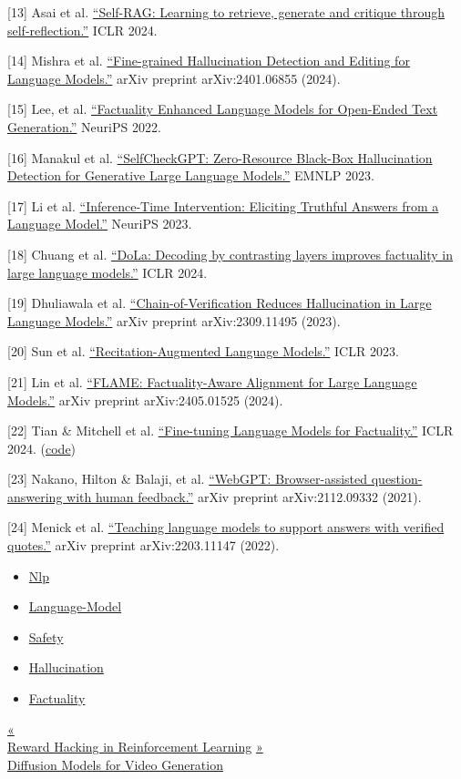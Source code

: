 {[}13{]} Asai et al. \href{https://arxiv.org/abs/2310.11511}{``Self-RAG: Learning to retrieve, generate and critique through self-reflection.''} ICLR 2024.

{[}14{]} Mishra et al. \href{https://arxiv.org/abs/2401.06855}{``Fine-grained Hallucination Detection and Editing for Language Models.''} arXiv preprint arXiv:2401.06855 (2024).

{[}15{]} Lee, et al. \href{https://arxiv.org/abs/2206.04624}{``Factuality Enhanced Language Models for Open-Ended Text Generation.''} NeuriPS 2022.

{[}16{]} Manakul et al. \href{https://arxiv.org/abs/2303.08896}{``SelfCheckGPT: Zero-Resource Black-Box Hallucination Detection for Generative Large Language Models.''} EMNLP 2023.

{[}17{]} Li et al. \href{https://arxiv.org/abs/2306.03341}{``Inference-Time Intervention: Eliciting Truthful Answers from a Language Model.''} NeuriPS 2023.

{[}18{]} Chuang et al. \href{https://arxiv.org/abs/2309.03883}{``DoLa: Decoding by contrasting layers improves factuality in large language models.''} ICLR 2024.

{[}19{]} Dhuliawala et al. \href{https://arxiv.org/abs/2309.11495}{``Chain-of-Verification Reduces Hallucination in Large Language Models.''} arXiv preprint arXiv:2309.11495 (2023).

{[}20{]} Sun et al. \href{https://arxiv.org/abs/2210.01296}{``Recitation-Augmented Language Models.''} ICLR 2023.

{[}21{]} Lin et al. \href{https://arxiv.org/abs/2405.01525}{``FLAME: Factuality-Aware Alignment for Large Language Models.''} arXiv preprint arXiv:2405.01525 (2024).

{[}22{]} Tian \& Mitchell et al. \href{https://arxiv.org/abs/2311.08401}{``Fine-tuning Language Models for Factuality.''} ICLR 2024. (\href{https://github.com/kttian/llm_factuality_tuning}{code})

{[}23{]} Nakano, Hilton \& Balaji, et al. \href{https://arxiv.org/abs/2112.09332}{``WebGPT: Browser-assisted question-answering with human feedback.''} arXiv preprint arXiv:2112.09332 (2021).

{[}24{]} Menick et al. \href{https://arxiv.org/abs/2203.11147}{``Teaching language models to support answers with verified quotes.''} arXiv preprint arXiv:2203.11147 (2022).

\begin{itemize}
\tightlist
\item
  \href{https://lilianweng.github.io/tags/nlp/}{Nlp}
\item
  \href{https://lilianweng.github.io/tags/language-model/}{Language-Model}
\item
  \href{https://lilianweng.github.io/tags/safety/}{Safety}
\item
  \href{https://lilianweng.github.io/tags/hallucination/}{Hallucination}
\item
  \href{https://lilianweng.github.io/tags/factuality/}{Factuality}
\end{itemize}

\href{https://lilianweng.github.io/posts/2024-11-28-reward-hacking/}{{« }\\
{Reward Hacking in Reinforcement Learning}} \href{https://lilianweng.github.io/posts/2024-04-12-diffusion-video/}{{ »}\\
{Diffusion Models for Video Generation}}

